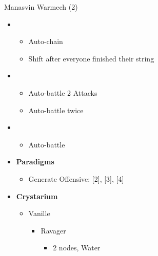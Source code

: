 \begin{battle}[0:52]{Manasvin Warmech (2)}
\begin{itemize}
\begin{itemize}
			      \end{itemize}
			\item \first
			      \begin{itemize}
				      \item Auto-chain
				      \item Shift after everyone finished their string
			      \end{itemize}
			\item \fourth
			      \begin{itemize}
				      \item Auto-battle 2 Attacks
				      \item Auto-battle twice
			      \end{itemize}
			\item \third
			      \begin{itemize}
				      \item Auto-battle
			      \end{itemize}
		\end{itemize}
	\end{battle}

	\begin{menu}
		\begin{itemize}
			\item \textbf{Paradigms}
			      \begin{itemize}
			      		\item Generate Offensive: [2], [3], [4]
			      \end{itemize}
			\item \textbf{Crystarium}
			      \begin{itemize}
				      \item Vanille
				            \begin{itemize}
					            \item Ravager
					                  \begin{itemize}
						                  \item 2 nodes, Water
					                  \end{itemize}
				            \end{itemize}
			      \end{itemize}
		\end{itemize}
	\end{menu}

	\renewcommand{\first}{[1] Relentless Assault (\com/\rav/\rav)}
	\renewcommand{\second}{[2] Tri-Disaster (\rav/\rav/\rav)}
	\renewcommand{\third}{[3]  Relentless Assault (\com/\rav/\rav)}
	\renewcommand{\fourth}{[4] Tri-Disaster (\rav/\rav/\rav)}

